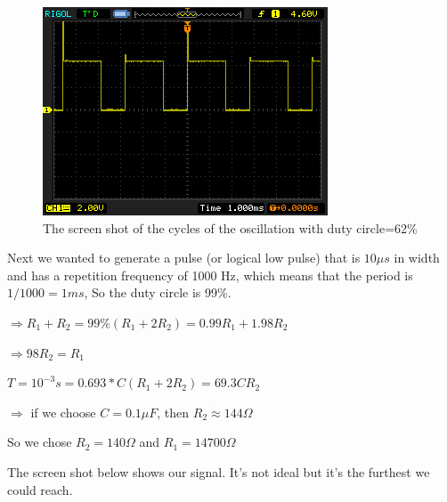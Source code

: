 \documentclass[11pt]{article}
\begin{document}
\begin{figure}[H]
 \begin{center}
  \includegraphics[width=\linewidth/2]{act5_1}
  \caption{The screen shot of the cycles of the oscillation with duty circle=62\%}
  \label{fig:act5_1}
 \end{center}
\end{figure}

Next we wanted to generate a pulse (or logical low pulse) that is $10 \mu s$ in width and has a repetition frequency of 1000 Hz, which means that the period is $1/1000=1ms$, So the duty circle is 99\%.

$\Rightarrow R_{1}+R_{2}=99\%(R_{1}+2R_{2})=0.99R_{1}+1.98R_{2}$

$\Rightarrow 98R_{2}=R_{1}$

$T=10^{-3}s=0.693*C(R_{1}+2R_{2})=69.3CR_{2}$

$\Rightarrow $ if we choose $C=0.1\mu F$, then $R_{2}\approx144\Omega$

So we chose $R_{2}=140\Omega$ and $R_{1}=14700\Omega$

The screen shot below shows our signal. It's not ideal but it's the furthest we could reach.
\end{document}
